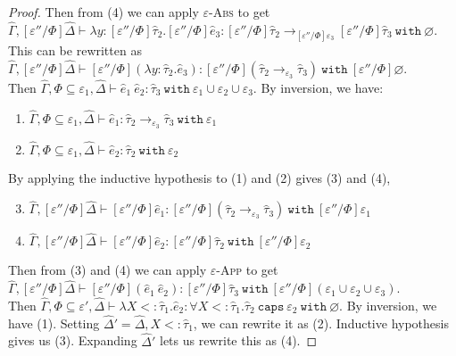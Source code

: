 \documentclass{llncs}
\newcommand{\keywadj}[1]{\mathtt{#1}}
\newcommand{\keyw}[1]{\keywadj{#1}~}
\newcommand{\kw}[1]{\keyw{ #1 }}
\begin{document}
\begin{proof}
Then from (4) we can apply \textsc{$\varepsilon$-Abs} to get $\hat \Gamma, [\varepsilon''/\Phi]\hat \Delta \vdash \lambda y: [\varepsilon''/\Phi]\hat \tau_2. [\varepsilon''/\Phi]\hat e_3: [\varepsilon''/\Phi]\hat \tau_2 \rightarrow_{[\varepsilon''/\Phi]\varepsilon_3} [\varepsilon''/\Phi]\hat \tau_3~\kw{with} \varnothing$. This can be rewritten as $\hat \Gamma, [\varepsilon''/\Phi]\hat \Delta \vdash [\varepsilon''/\Phi](\lambda y: \hat \tau_2. \hat e_3): [\varepsilon''/\Phi](\hat \tau_2 \rightarrow_{\varepsilon_3} \hat \tau_3)~\kw{with} [\varepsilon''/\Phi]\varnothing$.\\

 Then $\hat \Gamma, \Phi \subseteq \varepsilon_1, \hat \Delta \vdash \hat e_1~\hat e_2: \hat \tau_3~\kw{with} \varepsilon_1 \cup \varepsilon_2 \cup \varepsilon_3$. By inversion, we have:

\begin{enumerate}
	\item $\hat \Gamma, \Phi \subseteq \varepsilon_1, \hat \Delta \vdash \hat e_1: \hat \tau_2 \rightarrow_{\varepsilon_3} \hat \tau_3~\kw{with} \varepsilon_1$
	\item $\hat \Gamma, \Phi \subseteq \varepsilon_1, \hat \Delta \vdash \hat e_2: \hat \tau_2~\kw{with} \varepsilon_2$
\end{enumerate}

By applying the inductive hypothesis to (1) and (2) gives (3) and (4),

\begin{enumerate}
	\setcounter{enumi}{2}
	\item $\hat \Gamma, [\varepsilon''/\Phi]\hat \Delta \vdash [\varepsilon''/\Phi]\hat e_1: [\varepsilon''/\Phi](\hat \tau_2 \rightarrow_{\varepsilon_3} \hat \tau_3)~\kw{with} [\varepsilon''/\Phi]\varepsilon_1$
	\item $\hat \Gamma, [\varepsilon''/\Phi]\hat \Delta \vdash [\varepsilon''/\Phi]\hat e_2: [\varepsilon''/\Phi]\hat \tau_2~\kw{with} [\varepsilon''/\Phi]\varepsilon_2$
\end{enumerate}

Then from (3) and (4) we can apply \textsc{$\varepsilon$-App} to get $\hat \Gamma, [\varepsilon''/\Phi]\hat \Delta \vdash [\varepsilon''/\Phi](\hat e_1~\hat e_2): [\varepsilon''/\Phi]\hat \tau_3~\kw{with} [\varepsilon''/\Phi](\varepsilon_1 \cup \varepsilon_2 \cup \varepsilon_3)$.\\

 Then $\hat \Gamma, \Phi \subseteq \varepsilon', \hat \Delta \vdash \lambda X <: \hat \tau_1. \hat e_2: \forall X <: \hat \tau_1. \hat \tau_2~\kw{caps} \varepsilon_2~\kw{with} \varnothing$. By inversion, we have (1). Setting $\hat \Delta' = \hat \Delta, X <: \hat \tau_1$, we can rewrite it as (2). Inductive hypothesis gives us (3). Expanding $\hat \Delta'$ lets us rewrite this as (4).


\end{proof}
\end{document}
